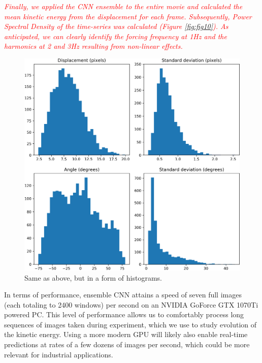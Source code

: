 \documentclass{svjour3}                     %
\newcommand{\new}[1]{\textit{\textcolor{red}{#1}}}
\begin{document}
\new{Finally, we applied the CNN ensemble to the entire movie and calculated the mean kinetic energy from the displacement for each frame. Subsequently, Power Spectral Density of the time-series was calculated (Figure \ref{fig:fig10}). As anticipated, we can clearly identify the forcing frequency at 1Hz and the harmonics at 2 and 3Hz resulting from non-linear effects.} 

\begin{figure}
\includegraphics[width=\textwidth/2]{figs/figure8b.png}
\caption{Same as above, but in a form of histograms.}
\label{fig:fig9b}
\end{figure}

In terms of performance, ensemble CNN attains a speed of seven full images (each totaling to 2400 windows) per second on an NVIDIA GoForce GTX 1070Ti powered PC. This level of performance allows us to comfortably process long sequences of images taken during experiment, which we use to study evolution of the kinetic energy. Using a more modern GPU will likely also enable real-time predictions at rates of a few dozens of images per second, which could be more relevant for industrial applications.
\end{document}
